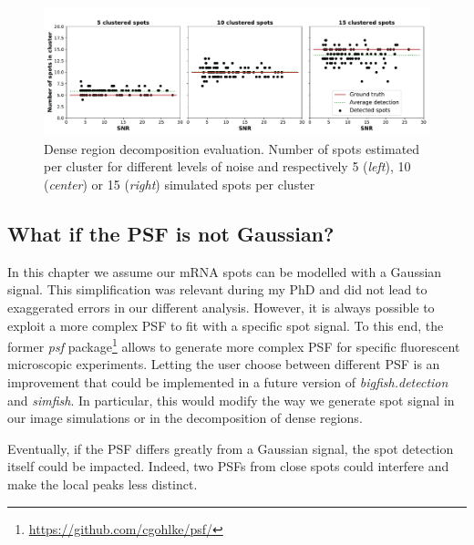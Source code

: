 \begin{figure}[h]
    \centering
    \includegraphics[width=1\textwidth]{figures/chapter2/cluster_along_noise}
    \caption{Dense region decomposition evaluation.
	 Number of spots estimated per cluster for different levels of noise and respectively 5 (\textit{left}), 10 (\textit{center}) or 15 (\textit{right}) simulated spots per cluster}
    \label{fig:cluster_results}
\end{figure}



\subsection{What if the \ac{PSF} is not Gaussian?}
\label{subsec:psf}

In this chapter we assume our \ac{mRNA} spots can be modelled with a Gaussian signal.
This simplification was relevant during my PhD and did not lead to exaggerated errors in our different analysis.
However, it is always possible to exploit a more complex \ac{PSF} to fit with a specific spot signal.
To this end, the former \emph{psf} package\footnote{\url{https://github.com/cgohlke/psf/}} allows to generate more complex \ac{PSF} for specific fluorescent microscopic experiments.
Letting the user choose between different \ac{PSF} is an improvement that could be implemented in a future version of \emph{bigfish.detection} and \emph{simfish}.
In particular, this would modify the way we generate spot signal in our image simulations or in the decomposition of dense regions.

Eventually, if the \ac{PSF} differs greatly from a Gaussian signal, the spot detection itself could be impacted.
Indeed, two \ac{PSF}s from close spots could interfere and make the local peaks less distinct.

